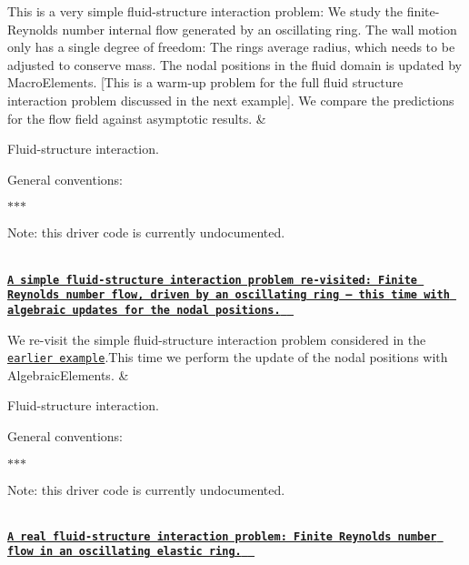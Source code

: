 \begin{longtabu}
This is a very simple fluid-\/structure interaction problem\+: We study the finite-\/\+Reynolds number internal flow generated by an oscillating ring. The wall motion only has a single degree of freedom\+: The ring\textquotesingle{}s average radius, which needs to be adjusted to conserve mass. The nodal positions in the fluid domain is updated by {\ttfamily Macro\+Elements}. \mbox{[}This is a warm-\/up problem for the full fluid structure interaction problem discussed in the next example\mbox{]}. We compare the predictions for the flow field against asymptotic results.  &
\begin{DoxyItemize}
\item Fluid-\/structure interaction.
\item General conventions\+:
\begin{DoxyItemize}
\item $\ast$$\ast$$\ast$
\end{DoxyItemize}
\item Note\+: this driver code is currently undocumented.   
\end{DoxyItemize}\\
\href{../../interaction/osc_ring_algebraic/html/index.html}{\tt {\bfseries A simple fluid-\/structure interaction problem re-\/visited\+: Finite Reynolds number flow, driven by an oscillating ring -- this time with algebraic updates for the nodal positions. } }

We re-\/visit the simple fluid-\/structure interaction problem considered in the \href{../../interaction/osc_ring_macro/html/index.html}{\tt earlier example}.This time we perform the update of the nodal positions with {\ttfamily Algebraic\+Elements}.  &
\begin{DoxyItemize}
\item Fluid-\/structure interaction.
\item General conventions\+:
\begin{DoxyItemize}
\item $\ast$$\ast$$\ast$
\end{DoxyItemize}
\item Note\+: this driver code is currently undocumented.   
\end{DoxyItemize}\\
\href{../../interaction/fsi_osc_ring/html/index.html}{\tt {\bfseries A real fluid-\/structure interaction problem\+: Finite Reynolds number flow in an oscillating elastic ring. } }


\end{longtabu}
